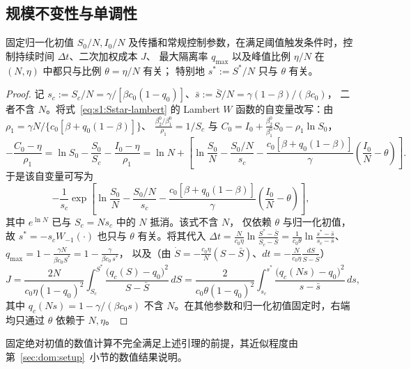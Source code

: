 \documentclass[lang=cn,a4paper,newtx]{elegantpaper}
\numberwithin{equation}{section}
\theoremstyle{plain}
\begin{document}
\subsection{规模不变性与单调性}
\label{sec:dom:theory}

\begin{lemma}\label{lem:dom:scaling}
固定归一化初值 $S_0/N,I_0/N$ 及传播和常规控制参数，在满足阈值触发条件时，控制持续时间 $\Delta t$、二次加权成本 $J$、
最大隔离率 $q_{\max}$ 以及峰值比例 $\eta/N$ 在 $(N,\eta)$ 中都只与比例 $\theta=\eta/N$ 有关；
特别地 $s^*:=S^\ast/N$ 只与 $\theta$ 有关。
\end{lemma}
\begin{proof}
记 $s_c:=S_c/N=\gamma/[\beta c_0(1-q_0)]$、$\bar s:=\bar S/N=\gamma(1-\beta)/(\beta c_0)$，
二者不含 $N$。将式~\eqref{eq:s1:Sstar-lambert} 的 Lambert $W$ 函数的自变量改写：由
$\rho_1=\gamma N/\{c_0[\beta+q_0(1-\beta)]\}$、
$\frac{\beta_2^0/\beta_1^0}{\rho_1}=1/S_c$ 与
$C_0=I_0+\tfrac{\beta_2^0}{\beta_1^0}S_0-\rho_1\ln S_0$，
\[
  -\frac{C_0-\eta}{\rho_1}
  = \ln S_0-\frac{S_0}{S_c}-\frac{I_0-\eta}{\rho_1}
  = \ln N+\left[
  \ln\frac{S_0}{N}-\frac{S_0/N}{s_c}
  -\frac{c_0[\beta+q_0(1-\beta)]}{\gamma}
  \left(\frac{I_0}{N}-\theta\right)
  \right].
\]
于是该自变量可写为
\[
-\frac{1}{s_c}
\exp\left[
\ln\frac{S_0}{N}-\frac{S_0/N}{s_c}
-\frac{c_0[\beta+q_0(1-\beta)]}{\gamma}
\left(\frac{I_0}{N}-\theta\right)
\right],
\]
其中 $e^{\ln N}$ 已与 $S_c=Ns_c$ 中的 $N$ 抵消。该式不含 $N$，
仅依赖 $\theta$ 与归一化初值，故
$s^*=-s_c W_{-1}(\cdot)$ 也只与 $\theta$ 有关。将其代入
$\Delta t=\frac{N}{c_0\eta}\ln\frac{S^\ast-\bar S}{S_c-\bar S}
 =\frac{1}{c_0\theta}\ln\frac{s^*-\bar s}{s_c-\bar s}$、
$q_{\max}=1-\frac{\gamma N}{\beta c_0 S^\ast}=1-\frac{\gamma}{\beta c_0\,s^*}$，
以及（由 $\dot S=-\frac{c_0\eta}{N}(S-\bar S)$、$dt=-\frac{N}{c_0\eta}\frac{dS}{S-\bar S}$）
\begin{equation}
  J=\frac{2N}{c_0\eta(1-q_0)^2}\int_{S_c}^{S^\ast}\frac{\big(q_c(S)-q_0\big)^2}{S-\bar S}\,dS
   =\frac{2}{c_0\theta(1-q_0)^2}\int_{s_c}^{s^*}\frac{\big(q_c(N s)-q_0\big)^2}{s-\bar s}\,ds,
  \label{eq:dom:Jtheta}
\end{equation}
其中 $q_c(N s)=1-\gamma/(\beta c_0 s)$ 不含 $N$。在其他参数和归一化初值固定时，右端均只通过 $\theta$ 依赖于 $N,\eta$。
\end{proof}

固定绝对初值的数值计算不完全满足上述引理的前提，其近似程度由第~\ref{sec:dom:setup}~小节的数值结果说明。
\end{document}
